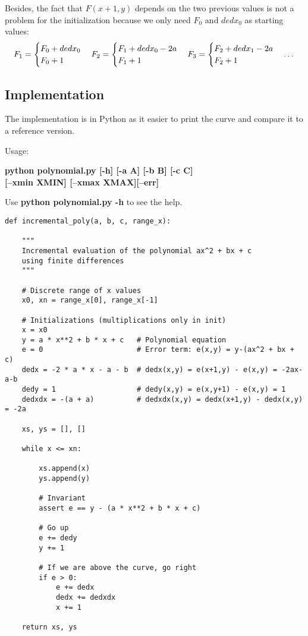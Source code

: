 \documentclass[a4paper,10pt]{article}
\begin{document}
\noindent
Besides, the fact that $F(x + 1, y)$ depends on the two previous values is not a problem for the initialization because we only need $F_0$ and $dedx_0$ as starting values:
\begin{equation}
	F_1 = 
	\begin{cases}
	F_0 + dedx_0 \\
	F_0 + 1
	\end{cases}
	F_2 = 
	\begin{cases}
	F_1 + dedx_0 -2a\\
	F_1 + 1
	\end{cases}
	F_3 = 
	\begin{cases}
	F_2 + dedx_1 -2a\\
	F_2 + 1
	\end{cases}
	\text{\dots}
\end{equation}

\bigskip
\subsection{Implementation}

The implementation is in Python as it easier to print the curve and compare it to a reference version.
\bigskip

\noindent
Usage:
\begin{center}
\textbf{python polynomial.py [-h] [-a A] [-b B] [-c C]} \\
\textbf{[--xmin XMIN] [--xmax XMAX][--err]}
\end{center}
\bigskip
Use \textbf{python polynomial.py -h} to see the help.

\newpage
\begin{lstlisting}
def incremental_poly(a, b, c, range_x):

    """
    Incremental evaluation of the polynomial ax^2 + bx + c
    using finite differences
    """

    # Discrete range of x values
    x0, xn = range_x[0], range_x[-1]

    # Initializations (multiplications only in init)
    x = x0
    y = a * x**2 + b * x + c   # Polynomial equation
    e = 0                      # Error term: e(x,y) = y-(ax^2 + bx + c)
    dedx = -2 * a * x - a - b  # dedx(x,y) = e(x+1,y) - e(x,y) = -2ax-a-b
    dedy = 1                   # dedy(x,y) = e(x,y+1) - e(x,y) = 1
    dedxdx = -(a + a)          # dedxdx(x,y) = dedx(x+1,y) - dedx(x,y) = -2a

    xs, ys = [], []

    while x <= xn:

        xs.append(x)
        ys.append(y)

        # Invariant
        assert e == y - (a * x**2 + b * x + c)

        # Go up
        e += dedy
        y += 1

        # If we are above the curve, go right
        if e > 0:
            e += dedx
            dedx += dedxdx
            x += 1

    return xs, ys
\end{lstlisting}
\end{document}
